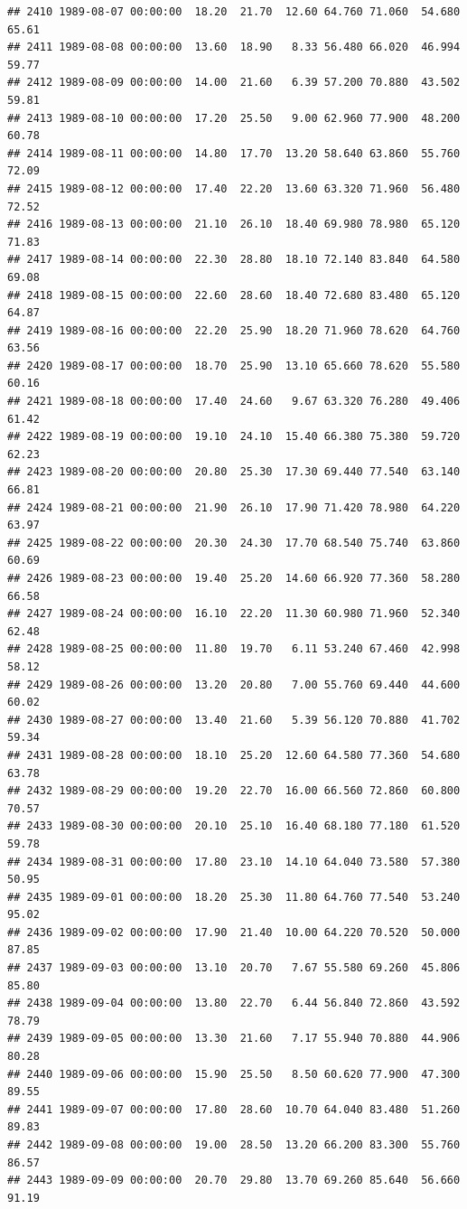 \documentclass{article}\usepackage{graphicx, color}
\makeatletter
\newenvironment{kframe}{%
 \def\at@end@of@kframe{}%
 \ifinner\ifhmode%
  \def\at@end@of@kframe{\end{minipage}}%
  \begin{minipage}{\columnwidth}%
 \fi\fi%
 \def\FrameCommand##1{\hskip\@totalleftmargin \hskip-\fboxsep
 \colorbox{shadecolor}{##1}\hskip-\fboxsep
     \hskip-\linewidth \hskip-\@totalleftmargin \hskip\columnwidth}%
 \MakeFramed {\advance\hsize-\width
   \@totalleftmargin\z@ \linewidth\hsize
   \@setminipage}}%
 {\par\unskip\endMakeFramed%
 \at@end@of@kframe}
\newenvironment{knitrout}{}{} %
\makeatother
\begin{document}
\begin{knitrout}
\begin{kframe}
\begin{verbatim}
## 2410 1989-08-07 00:00:00  18.20  21.70  12.60 64.760 71.060  54.680  65.61
## 2411 1989-08-08 00:00:00  13.60  18.90   8.33 56.480 66.020  46.994  59.77
## 2412 1989-08-09 00:00:00  14.00  21.60   6.39 57.200 70.880  43.502  59.81
## 2413 1989-08-10 00:00:00  17.20  25.50   9.00 62.960 77.900  48.200  60.78
## 2414 1989-08-11 00:00:00  14.80  17.70  13.20 58.640 63.860  55.760  72.09
## 2415 1989-08-12 00:00:00  17.40  22.20  13.60 63.320 71.960  56.480  72.52
## 2416 1989-08-13 00:00:00  21.10  26.10  18.40 69.980 78.980  65.120  71.83
## 2417 1989-08-14 00:00:00  22.30  28.80  18.10 72.140 83.840  64.580  69.08
## 2418 1989-08-15 00:00:00  22.60  28.60  18.40 72.680 83.480  65.120  64.87
## 2419 1989-08-16 00:00:00  22.20  25.90  18.20 71.960 78.620  64.760  63.56
## 2420 1989-08-17 00:00:00  18.70  25.90  13.10 65.660 78.620  55.580  60.16
## 2421 1989-08-18 00:00:00  17.40  24.60   9.67 63.320 76.280  49.406  61.42
## 2422 1989-08-19 00:00:00  19.10  24.10  15.40 66.380 75.380  59.720  62.23
## 2423 1989-08-20 00:00:00  20.80  25.30  17.30 69.440 77.540  63.140  66.81
## 2424 1989-08-21 00:00:00  21.90  26.10  17.90 71.420 78.980  64.220  63.97
## 2425 1989-08-22 00:00:00  20.30  24.30  17.70 68.540 75.740  63.860  60.69
## 2426 1989-08-23 00:00:00  19.40  25.20  14.60 66.920 77.360  58.280  66.58
## 2427 1989-08-24 00:00:00  16.10  22.20  11.30 60.980 71.960  52.340  62.48
## 2428 1989-08-25 00:00:00  11.80  19.70   6.11 53.240 67.460  42.998  58.12
## 2429 1989-08-26 00:00:00  13.20  20.80   7.00 55.760 69.440  44.600  60.02
## 2430 1989-08-27 00:00:00  13.40  21.60   5.39 56.120 70.880  41.702  59.34
## 2431 1989-08-28 00:00:00  18.10  25.20  12.60 64.580 77.360  54.680  63.78
## 2432 1989-08-29 00:00:00  19.20  22.70  16.00 66.560 72.860  60.800  70.57
## 2433 1989-08-30 00:00:00  20.10  25.10  16.40 68.180 77.180  61.520  59.78
## 2434 1989-08-31 00:00:00  17.80  23.10  14.10 64.040 73.580  57.380  50.95
## 2435 1989-09-01 00:00:00  18.20  25.30  11.80 64.760 77.540  53.240  95.02
## 2436 1989-09-02 00:00:00  17.90  21.40  10.00 64.220 70.520  50.000  87.85
## 2437 1989-09-03 00:00:00  13.10  20.70   7.67 55.580 69.260  45.806  85.80
## 2438 1989-09-04 00:00:00  13.80  22.70   6.44 56.840 72.860  43.592  78.79
## 2439 1989-09-05 00:00:00  13.30  21.60   7.17 55.940 70.880  44.906  80.28
## 2440 1989-09-06 00:00:00  15.90  25.50   8.50 60.620 77.900  47.300  89.55
## 2441 1989-09-07 00:00:00  17.80  28.60  10.70 64.040 83.480  51.260  89.83
## 2442 1989-09-08 00:00:00  19.00  28.50  13.20 66.200 83.300  55.760  86.57
## 2443 1989-09-09 00:00:00  20.70  29.80  13.70 69.260 85.640  56.660  91.19

\end{verbatim}
\end{kframe}
\end{knitrout}
\end{document}
